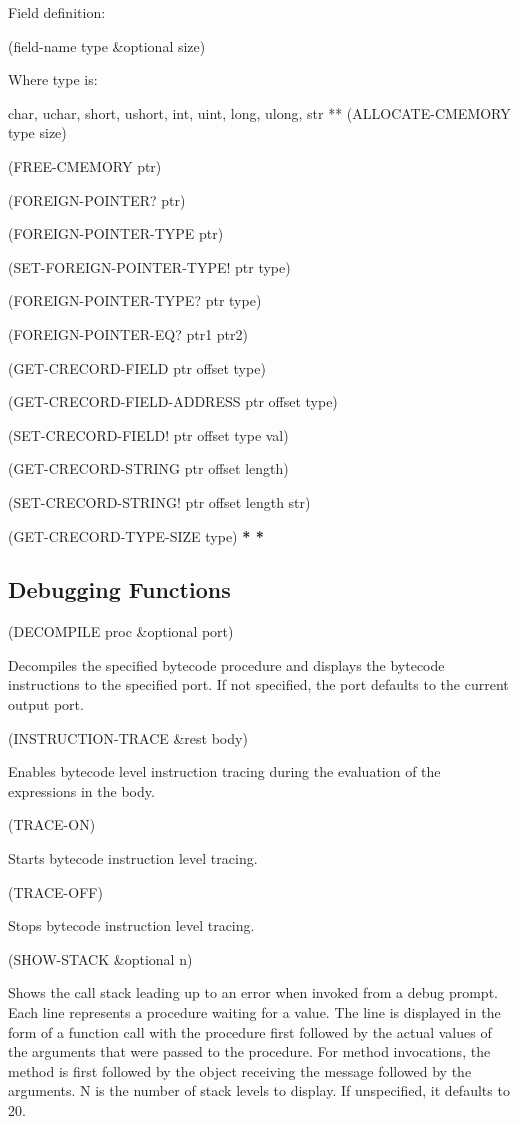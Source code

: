 \documentclass[11pt]{article}
\begin{document}
Field definition:

(field-name type \&optional size)

Where type is:

char, uchar, short, ushort, int, uint, long, ulong, str
**
(ALLOCATE-CMEMORY type size)

(FREE-CMEMORY ptr)

(FOREIGN-POINTER? ptr)

(FOREIGN-POINTER-TYPE ptr)

(SET-FOREIGN-POINTER-TYPE! ptr type)

(FOREIGN-POINTER-TYPE? ptr type)

(FOREIGN-POINTER-EQ? ptr1 ptr2)

(GET-CRECORD-FIELD ptr offset type)

(GET-CRECORD-FIELD-ADDRESS ptr offset type)

(SET-CRECORD-FIELD! ptr offset type val)

(GET-CRECORD-STRING ptr offset length)

(SET-CRECORD-STRING! ptr offset length str)

(GET-CRECORD-TYPE-SIZE type)
\textbf{*
*}

\subsection{Debugging Functions}
\label{sec-1-46}

(DECOMPILE proc \&optional port)

Decompiles the specified bytecode procedure and displays the bytecode
instructions to the specified port.  If not specified, the port defaults
to the current output port.

(INSTRUCTION-TRACE \&rest body)

Enables bytecode level instruction tracing during the evaluation of the
expressions in the body.

(TRACE-ON)

Starts bytecode instruction level tracing.

(TRACE-OFF)

Stops bytecode instruction level tracing.

(SHOW-STACK \&optional n)

Shows the call stack leading up to an error when invoked from a debug
prompt.  Each line represents a procedure waiting for a value.  The line
is displayed in the form of a function call with the procedure first
followed by the actual values of the arguments that were passed to the
procedure.  For method invocations, the method is first followed by the
object receiving the message followed by the arguments.  N is the number
of stack levels to display.  If unspecified, it defaults to 20.
\end{document}
